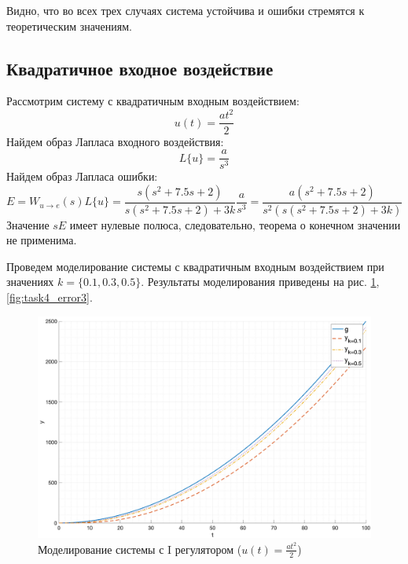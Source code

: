 
Видно, что во всех трех случаях система устойчива и ошибки стремятся к теоретическим значениям. 

\subsection{Квадратичное входное воздействие}
Рассмотрим систему с квадратичным входным воздействием:
\begin{equation}
    u(t) = \frac{at^2}{2}
\end{equation}
Найдем образ Лапласа входного воздействия:
\begin{equation}
    L\{u\} = \frac{a}{s^3}
\end{equation}
Найдем образ Лапласа ошибки:
\begin{equation}
    E = W_{u\rightarrow e}(s)L\{u\} = \frac{s(s^2 + 7.5s + 2)}{s(s^2 + 7.5s + 2) + 3k}\frac{a}{s^3} = \frac{a(s^2 + 7.5s + 2)}{s^2(s(s^2 + 7.5s + 2) + 3k)}
\end{equation}
Значение $sE$ имеет нулевые полюса, следовательно, теорема о конечном значении не применима.

Проведем моделирование системы с квадратичным входным воздействием при значениях $k = \{0.1, 0.3, 0.5\}$.
Результаты моделирования приведены на рис. \ref{fig:task4_out3}, \ref{fig:task4_error3}.

\begin{figure}[ht!]
    \centering
    \includegraphics[width=\textwidth]{"media/plots/task4_out3.png"}
    \caption{Моделирование системы с I регулятором ($u(t) = \frac{at^2}{2}$)}
    \label{fig:task4_out3}
\end{figure}

